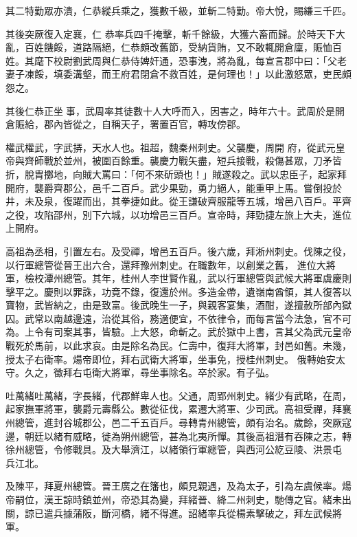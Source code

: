 \begin{pinyinscope}
 其二特勤眾亦潰，仁恭縱兵乘之，獲數千級，並斬二特勤。帝大悅，賜縑三千匹。



 其後突厥復入定襄，仁
 恭率兵四千掩擊，斬千餘級，大獲六畜而歸。於時天下大亂，百姓饑餒，道路隔絕，仁恭頗改舊節，受納貨賄，又不敢輒開倉廩，賑恤百姓。其麾下校尉劉武周與仁恭侍婢奸通，恐事洩，將為亂，每宣言郡中曰：「父老妻子凍餒，填委溝壑，而王府君閉倉不救百姓，是何理也！」以此激怒眾，吏民頗怨之。



 其後仁恭正坐事，武周率其徒數十人大呼而入，因害之，時年六十。武周於是開倉賑給，郡內皆從之，自稱天子，署置百官，轉攻傍郡。



 權武權武，字武挵，天水人也。祖超，魏秦州刺史。父襲慶，周開
 府，從武元皇帝與齊師戰於並州，被圍百餘重。襲慶力戰矢盡，短兵接戰，殺傷甚眾，刀矛皆折，脫胄擲地，向賊大罵曰：「何不來斫頭也！」賊遂殺之。武以忠臣子，起家拜開府，襲爵齊郡公，邑千二百戶。武少果勁，勇力絕人，能重甲上馬。嘗倒投於井，未及泉，復躍而出，其拳捷如此。從王謙破齊服龍等五城，增邑八百戶。平齊之役，攻陷邵州，別下六城，以功增邑三百戶。宣帝時，拜勁捷左旅上大夫，進位上開府。



 高祖為丞相，引置左右。及受禪，增邑五百戶。後六歲，拜淅州刺史。伐陳之役，以行軍總管從晉王出六合，還拜豫州刺史。在職數年，以創業之舊，
 進位大將軍，檢校潭州總管。其年，桂州人李世賢作亂，武以行軍總管與武候大將軍虞慶則擊平之。慶則以罪誅，功竟不錄，復還於州。多造金帶，遺嶺南酋領，其人復答以寶物，武皆納之，由是致富。後武晚生一子，與親客宴集，酒酣，遂擅赦所部內獄囚。武常以南越邊遠，治從其俗，務適便宜，不依律令，而每言當今法急，官不可為。上令有司案其事，皆驗。上大怒，命斬之。武於獄中上書，言其父為武元皇帝戰死於馬前，以此求哀。由是除名為民。仁壽中，復拜大將軍，封邑如舊。未幾，授太子右衛率。煬帝即位，拜右武衛大將軍，坐事免，授桂州刺史。
 俄轉始安太守。久之，徵拜右屯衛大將軍，尋坐事除名。卒於家。有子弘。



 吐萬緒吐萬緒，字長緒，代郡鮮卑人也。父通，周郢州刺史。緒少有武略，在周，起家撫軍將軍，襲爵元壽縣公。數從征伐，累遷大將軍、少司武。高祖受禪，拜襄州總管，進封谷城郡公，邑二千五百戶。尋轉青州總管，頗有治名。歲餘，突厥寇邊，朝廷以緒有威略，徙為朔州總管，甚為北夷所憚。其後高祖潛有吞陳之志，轉徐州總管，令修戰具。及大舉濟江，以緒領行軍總管，與西河公紇豆陵、洪景屯
 兵江北。



 及陳平，拜夏州總管。晉王廣之在籓也，頗見親遇，及為太子，引為左虞候率。煬帝嗣位，漢王諒時鎮並州，帝恐其為變，拜緒晉、絳二州刺史，馳傳之官。緒未出關，諒已遣兵據蒲阪，斷河橋，緒不得進。詔緒率兵從楊素擊破之，拜左武候將軍。




\end{pinyinscope}
